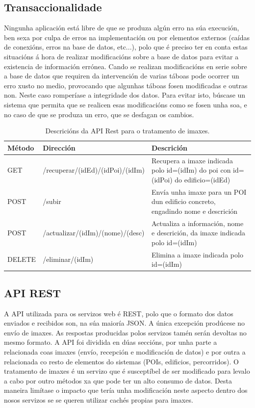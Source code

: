 \subsection{Transaccionalidade}
Ningunha aplicación está libre de que se produza algún erro na súa execución, ben sexa por culpa de erros na implementación ou por elementos externos (caídas de conexións, erros na base de datos, etc...), polo que é preciso ter en conta estas situacións á hora de realizar modificacións sobre a base de datos para evitar a existencia de información errónea. Cando se realizan modificacións en serie sobre a base de datos que requiren da intervención de varias táboas pode ocorrer un erro xusto no medio, provocando que algunhas táboas fosen modificadas e outras non. Neste caso romperíase a integridade dos datos. Para evitar isto, búscase un sistema que permita que se realicen esas modificacións como se fosen unha soa, e no caso de que se produza un erro, que se desfagan os cambios.

\begin{table} [tbh]
	\footnotesize
	\centering
	\begin{tabular}{|l|p{6cm}|p{6cm}|}
		\hline 
		\textbf{Método}	& \textbf{Dirección} & \textbf{Descrición} \\ 
		\hline 
		GET & /recuperar/(idEd)/(idPoi)/(idIm) & Recupera a imaxe indicada polo id=(idIm) do poi con id=(idPoi) do edificio=(idEd) \\ 
		\hline 
		POST & /subir & Envía unha imaxe para un POI dun edificio concreto, engadindo nome e descrición \\ 
		\hline 
		POST & /actualizar/(idIm)/(nome)/(desc) & Actualiza a información, nome e descrición, da imaxe indicada polo id=(idIm) \\ 
		\hline 
		DELETE & /eliminar/(idIm) & Elimina a imaxe indicada polo id=(idIm) \\ 
		\hline 
	\end{tabular}
	\caption{Descricións da API Rest para o tratamento de imaxes.}
	\label{tab:APIImaxes}
\end{table}

\subsection{API REST}
A API utilizada para os servizos web é REST, polo que o formato dos datos enviados e recibidos son, na súa maioría JSON. A única excepción prodúcese no envío de imaxes. As respostas producidas polos servizos tamén serán devoltas no mesmo formato.
A API foi dividida en dúas seccións, por unha parte a relacionada coas imaxes (envío, recepción e modificación de datos) e por outra a relacionada co resto de elementos do sistemas (POIs, edificios, percorridos). O tratamento de imaxes é un servizo que é susceptíbel de ser modificado para levalo a cabo por outro métodos xa que pode ter un alto consumo de datos. Desta maneira limítase o impacto que tería unha modificación neste aspecto dentro dos nosos servizos se se queren utilizar cachés propias para imaxes.

